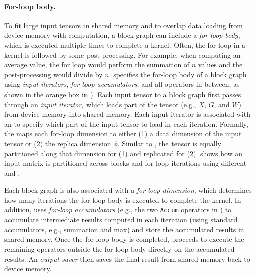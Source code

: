 \paragraph{For-loop body.} To fit large input tensors in shared memory and to overlap data loading from device memory with computation, a block graph can include a {\em for-loop body}, which is executed multiple times to complete a kernel.
Often, the for loop in a kernel is followed by some post-processing. For example, when computing an average value, the for loop would perform the summation of $n$ values and the post-processing would divide by $n$. 
\Sys specifies the for-loop body of a block graph using {\em input iterators}, {\em for-loop accumulators}, and all operators in between, as shown in the orange box in ). 
Each input tensor to a block graph first passes through an {\em input iterator}, which loads part of the tensor (e.g., $\overline{X}$, $\overline{G}$, and $\overline{W}$) from device memory into shared memory.
Each input iterator is associated with an {\em \fmap} to specify which part of the input tensor to load in each iteration. Formally, the  maps each for-loop dimension to either (1) a data dimension of the input tensor or (2) the replica dimension $\phi$. 
Similar to \imap, the tensor is equally partitioned along that dimension for (1) and replicated for (2).
%
 shows how an input matrix is partitioned across blocks and for-loop iterations using different \imap and \fmap.

Each block graph is also associated with a {\em for-loop dimension}, which determines how many iterations the for-loop body is executed to complete the kernel. In addition, \sys uses {\em for-loop accumulators} (e.g., the two {\tt Accum} operators in ) to accumulate intermediate results computed in each iteration (using standard accumulators, e.g., summation and max) and store the accumulated results in shared memory. Once the for-loop body is completed, \sys proceeds to execute the remaining operators outside the for-loop body directly on the accumulated results. An {\em output saver} then saves the final result from shared memory back to device memory.



